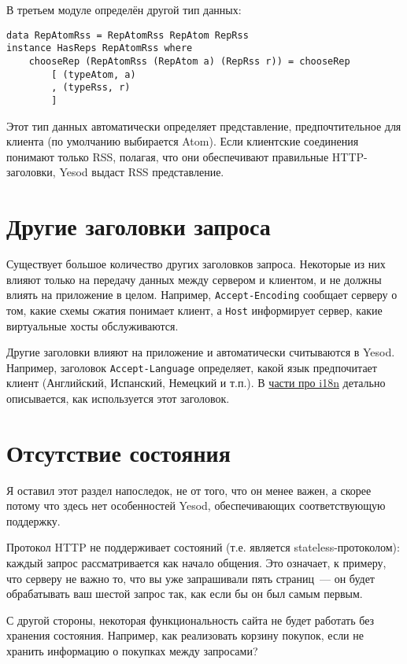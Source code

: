 В третьем модуле определён другой тип данных:

\begin{lstlisting}
data RepAtomRss = RepAtomRss RepAtom RepRss
instance HasReps RepAtomRss where
    chooseRep (RepAtomRss (RepAtom a) (RepRss r)) = chooseRep
        [ (typeAtom, a)
        , (typeRss, r)
        ]
\end{lstlisting}

Этот тип данных автоматически определяет представление, предпочтительное для клиента (по умолчанию выбирается Atom). Если клиентские соединения понимают только RSS, полагая, что они обеспечивают правильные HTTP-заголовки, Yesod выдаст RSS представление.

\section{Другие заголовки запроса}

Существует большое количество других заголовков запроса. Некоторые из них влияют только на
передачу данных между сервером и клиентом, и не должны влиять на приложение в целом.
Например, \verb*|Accept-Encoding| сообщает серверу о том, какие схемы сжатия понимает
клиент, а \verb*|Host| информирует сервер, какие виртуальные хосты обслуживаются.

Другие заголовки влияют на приложение и автоматически считываются в Yesod. Например,
заголовок \verb*|Accept-Language| определяет, какой язык предпочитает клиент (Английский,
Испанский, Немецкий и т.п.). В
\hyperref[chap:i18n]{части про i18n} детально описывается, как используется этот
заголовок.

\section{Отсутствие состояния}

Я оставил этот раздел напоследок, не от того, что он менее важен, а скорее потому что
здесь нет особенностей Yesod, обеспечивающих соответствующую поддержку.

Протокол HTTP не поддерживает состояний (т.е. является stateless-протоколом): каждый
запрос рассматривается
как начало общения. Это означает, к примеру, что серверу не важно то, что вы уже
запрашивали пять страниц~--- он будет обрабатывать ваш шестой запрос так, как если бы он
был самым первым.

С другой стороны, некоторая функциональность сайта не будет работать без хранения состояния. Например, как реализовать корзину покупок, если не хранить информацию о покупках между запросами?

